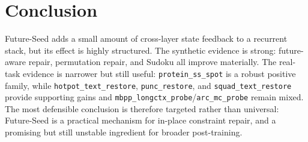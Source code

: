 \documentclass{article}
\begin{document}
\section{Conclusion}
Future-Seed adds a small amount of cross-layer state feedback to a recurrent stack, but its effect is highly structured. The synthetic evidence is strong: future-aware repair, permutation repair, and Sudoku all improve materially. The real-task evidence is narrower but still useful: \texttt{protein\_ss\_spot} is a robust positive family, while \texttt{hotpot\_text\_restore}, \texttt{punc\_restore}, and \texttt{squad\_text\_restore} provide supporting gains and \texttt{mbpp\_longctx\_probe}/\texttt{arc\_mc\_probe} remain mixed. The most defensible conclusion is therefore targeted rather than universal: Future-Seed is a practical mechanism for in-place constraint repair, and a promising but still unstable ingredient for broader post-training.




\newpage
{}
\appendix


\newpage
{}

\end{document}
